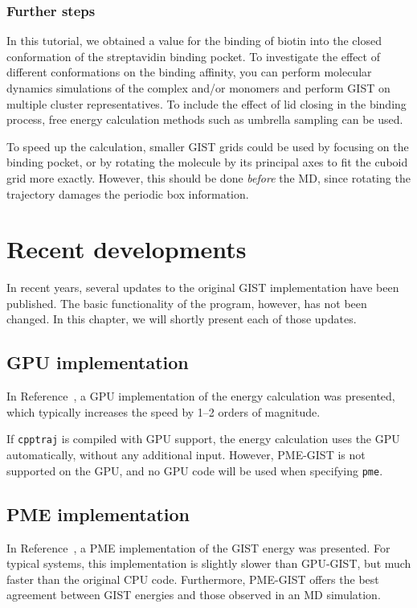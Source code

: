 \documentclass[9pt,tutorial]{livecoms}
\newcommand{\software}{\texttt}
\newcommand\inlinecode{\texttt}
\begin{document}
\subsubsection{Further steps}
In this tutorial, we obtained a value for the binding of biotin into the closed conformation of the streptavidin binding pocket.
To investigate the effect of different conformations on the binding affinity, you can perform molecular dynamics simulations of the complex and/or monomers and perform GIST on multiple cluster representatives.
To include the effect of lid closing in the binding process, free energy calculation methods such as umbrella sampling can be used.

To speed up the calculation, smaller GIST grids could be used by focusing on the binding pocket, or by rotating the molecule by its principal axes to fit the cuboid grid more exactly.
However, this should be done \emph{before} the MD, since rotating the trajectory damages the periodic box information.

\section{Recent developments}
In recent years, several updates to the original GIST implementation have been published.
The basic functionality of the program, however, has not been changed.
In this chapter, we will shortly present each of those updates.
\subsection{GPU implementation}
In Reference~\cite{Kraml2020}, a GPU implementation of the energy calculation was presented, which typically increases the speed by 1--2 orders of magnitude.

If \software{cpptraj} is compiled with GPU support, the energy calculation uses the GPU automatically, without any additional input.
However, PME-GIST is not supported on the GPU, and no GPU code will be used when specifying \inlinecode{pme}.

\subsection{PME implementation}
In Reference~\cite{Chen2021}, a PME implementation of the GIST energy was presented.
For typical systems, this implementation is slightly slower than GPU-GIST, but much faster than the original CPU code.
Furthermore, PME-GIST offers the best agreement between GIST energies and those observed in an MD simulation.
\end{document}
